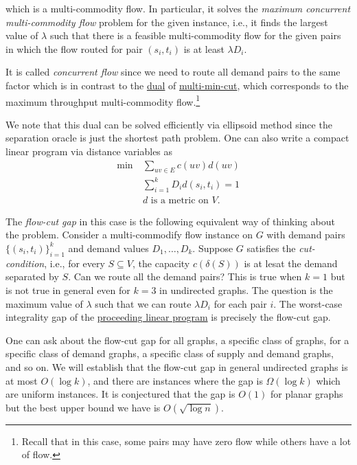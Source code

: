 which is a multi-commodity flow. In particular, it solves the \emph{maximum concurrent multi-commodity flow} problem for the given instance, i.e., it finds the largest value of \(\lambda \) such that there is a feasible multi-commodity flow for the given pairs in which the flow routed for pair \((s_i, t_i)\) is at least \(\lambda D_i\).

\begin{notation}
	It is called \emph{concurrent flow} since we need to route all demand pairs to the same factor which is in contrast to the \hyperref[eq:multi-min-cut-LP]{dual} of \hyperref[prb:multi-min-cut]{multi-min-cut}, which corresponds to the maximum throughput multi-commodity flow.\footnote{Recall that in this case, some pairs may have zero flow while others have a lot of flow.}
\end{notation}

We note that this dual can be solved efficiently via ellipsoid method since the separation oracle is just the shortest path problem. One can also write a compact linear program via distance variables as
\[
	\begin{aligned}
		\min~ & \sum_{uv \in E} c(uv) d(uv)        \\
		      & \sum_{i=1}^{k} D_i d(s_i, t_i) = 1 \\
		      & \text{\(d\) is a metric on \(V\)}.
	\end{aligned}
\]

\begin{remark}
	The \emph{flow-cut gap} in this case is the following equivalent way of thinking about the problem. Consider a multi-commodify flow instance on \(G\) with demand pairs \(\{ (s_i, t_i) \} _{i = 1}^{k}\) and demand values \(D_1, \dots , D_k\). Suppose \(G\) satisfies the \emph{cut-condition}, i.e., for every \(S \subseteq V\), the capacity \(c(\delta (S))\) is at lesat the demand separated by \(S\). Can we route all the demand pairs? This is true when \(k = 1\) but is not true in general even for \(k = 3\) in undirected graphs. The question is the maximum value of \(\lambda \) such that we can route \(\lambda D_i\) for each pair \(i\). The worst-case integrality gap of the \hyperref[eq:non-uniform-sparsest-cut-LP-primal]{proceeding linear program} is precisely the flow-cut gap.

	One can ask about the flow-cut gap for all graphs, a specific class of graphs, for a specific class of demand graphs, a specific class of supply and demand graphs, and so on. We will establish that the flow-cut gap in general undirected graphs is at most \(O(\log k)\), and there are instances where the gap is \(\Omega (\log k)\) which are uniform instances. It is conjectured that the gap is \(O(1)\) for planar graphs but the best upper bound we have is \(O(\sqrt{\log n} )\).
\end{remark}


